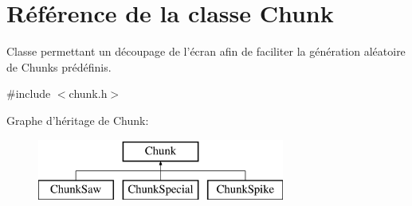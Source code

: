\hypertarget{class_chunk}{\section{Référence de la classe Chunk}
\label{class_chunk}
}


Classe permettant un découpage de l'écran afin de faciliter la génération aléatoire de Chunks prédéfinis.  




{\ttfamily \#include $<$chunk.\+h$>$}

Graphe d'héritage de Chunk\+:\begin{figure}[H]
\begin{center}
\leavevmode
\includegraphics[height=2.000000cm]{class_chunk}
\end{center}
\end{figure}
